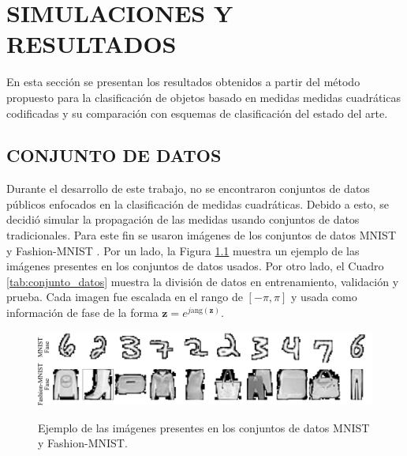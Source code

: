 
\chapter{SIMULACIONES Y RESULTADOS}

En esta sección se presentan los resultados obtenidos a partir del método propuesto para la clasificación de objetos basado en medidas medidas cuadráticas codificadas y su comparación con esquemas de clasificación del estado del arte.

\section{CONJUNTO DE DATOS}

Durante el desarrollo de este trabajo, no se encontraron conjuntos de datos públicos enfocados en la clasificación de medidas cuadráticas. Debido a esto, se decidió simular la propagación de las medidas usando conjuntos de datos tradicionales. Para este fin se usaron imágenes de los conjuntos de datos MNIST  y Fashion-MNIST . Por un lado, la Figura \ref{fig:conjunto_datos} muestra un ejemplo de las imágenes presentes en los conjuntos de datos usados. Por otro lado, el Cuadro \ref{tab:conjunto_datos} muestra la división de datos en entrenamiento, validación y prueba. Cada imagen fue escalada en el rango de $[-\pi, \pi]$ y usada como información de fase de la forma $\mathbf{z}=e^{j\mathrm{ang}(\mathbf{z})}$.

\begin{figure}[!h]
    \centering
    \caption{Ejemplo de las imágenes presentes en los conjuntos de datos MNIST y Fashion-MNIST.}
    \includegraphics[width=\linewidth]{images/resultados/datasets.pdf}
    \label{fig:conjunto_datos}
\end{figure}



